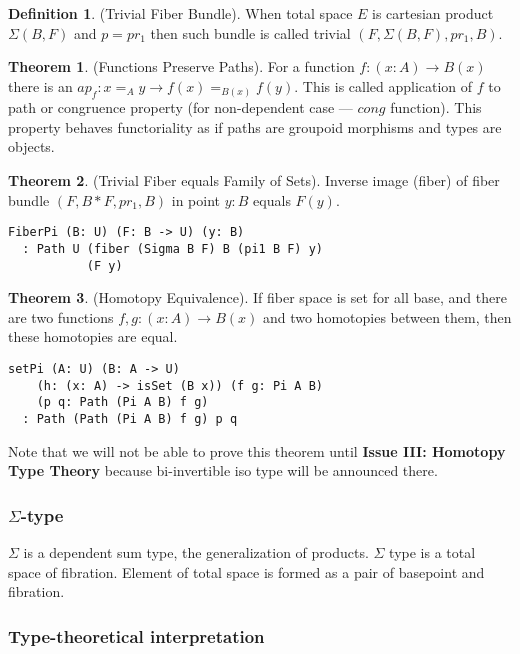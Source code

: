 \documentclass{article}
\theoremstyle{definition}
\newtheorem{theorem}{Theorem}
\newtheorem{definition}{Definition}
\begin{document}
\begin{definition} (Trivial Fiber Bundle).
When total space $E$ is cartesian product $\Sigma(B,F)$ and $p = pr_1$
then such bundle is called trivial $(F,\Sigma(B,F),pr_1,B)$.
\end{definition}

\begin{theorem} (Functions Preserve Paths).
For a function $f: (x:A) \rightarrow B(x)$
there is an $ap_f : x =_A y \rightarrow f(x) =_{B(x)} f(y)$. This is called
application of $f$ to path or congruence property (for non-dependent case ---
$cong$ function). This property behaves functoriality
as if paths are groupoid morphisms and types are objects.
\end{theorem}

\begin{theorem} (Trivial Fiber equals Family of Sets).
Inverse image (fiber) of fiber bundle $(F,B*F,pr_1,B)$ in point $y:B$ equals $F(y)$.
\begin{lstlisting}
FiberPi (B: U) (F: B -> U) (y: B)
  : Path U (fiber (Sigma B F) B (pi1 B F) y)
           (F y)
\end{lstlisting}
\end{theorem}

\begin{theorem} (Homotopy Equivalence).
If fiber space is set for all base, and
there are two functions $f,g : (x:A) \rightarrow B(x)$ and two
homotopies between them, then these homotopies are equal.
\begin{lstlisting}
setPi (A: U) (B: A -> U)
    (h: (x: A) -> isSet (B x)) (f g: Pi A B)
    (p q: Path (Pi A B) f g)
  : Path (Path (Pi A B) f g) p q
\end{lstlisting}
\end{theorem}

Note that we will not be able to prove this theorem
until {\bf Issue III: Homotopy Type Theory} because
bi-invertible iso type will be announced there.

\subsubsection{$\Sigma$-type}

$\Sigma$ is a dependent sum type, the generalization of products.
$\Sigma$ type is a total space of fibration. Element of total
space is formed as a pair of basepoint and fibration.

\subsubsection*{Type-theoretical interpretation}
\end{document}
